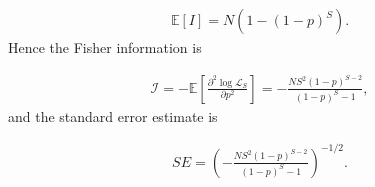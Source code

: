 \documentclass{article}
\begin{document}
\begin{align}
\mathbb{E}\left[I\right] = N(1-(1-p)^S). \label{eq:exp_intercept}
\end{align} 
Hence the Fisher information is

\begin{align}
\mathcal{I} = -\mathbb{E}\left[\frac{\partial^2 \log\mathcal{L}_S}{\partial p^2}\right]=
 -\frac{NS^2(1-p)^{S-2}}{(1-p)^S-1}, \label{eq:fisher_information}
\end{align}
and the standard error estimate is

\begin{align}
SE = \left(-\frac{NS^2(1-p)^{S-2}}{(1-p)^S-1}\right)^{-1/2}. \label{eq:general_SE_calc}
\end{align}

\end{document}
